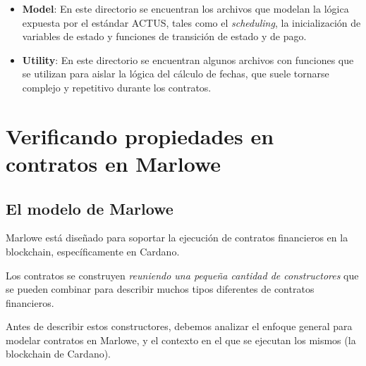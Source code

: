 \documentclass{beamer}
\begin{document}
\begin{frame}[fragile]
    \begin{itemize}
        \item \textbf{Model}: En este directorio se encuentran los archivos que modelan la lógica expuesta por el estándar ACTUS, tales como el \textit{scheduling}, la inicialización de variables de estado y funciones de transición de estado y de pago.
            \pause

            \pause
        \item \textbf{Utility}: En este directorio se encuentran algunos archivos con funciones que se utilizan para aislar la lógica del cálculo de fechas, que suele tornarse complejo y repetitivo durante los contratos.


    \end{itemize}
\end{frame}



\section{Verificando propiedades en contratos en Marlowe}

\subsection{El modelo de Marlowe}

\begin{frame}
Marlowe está diseñado para soportar la ejecución de contratos financieros en la blockchain, específicamente en Cardano.

\medskip
\pause

Los contratos se construyen \textit{reuniendo una pequeña cantidad de constructores} que se pueden combinar para describir muchos tipos diferentes de contratos financieros.

\medskip
\pause

Antes de describir estos constructores, debemos analizar el enfoque general para modelar contratos en Marlowe, y el contexto en el que se ejecutan los mismos (la blockchain de Cardano).

\end{frame}
\end{document}
